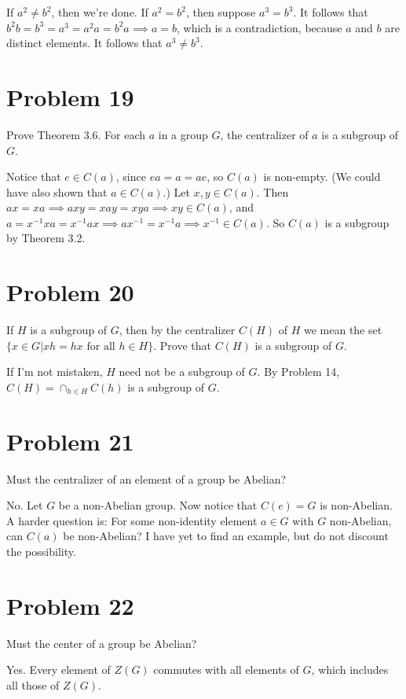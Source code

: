\documentclass[12pt]{article}
\begin{document}
If $a^2\neq b^2$, then we're done.  If $a^2=b^2$, then suppose $a^3=b^3$.
It follows that $b^2b = b^3=a^3=a^2a=b^2a\implies a=b$, which is a contradiction,
because $a$ and $b$ are distinct elements.  It follows that $a^3\neq b^3$.

\section*{Problem 19}

Prove Theorem 3.6.  For each $a$ in a group $G$, the centralizer
of $a$ is a subgroup of $G$.

Notice that $e\in C(a)$, since $ea=a=ae$, so $C(a)$ is non-empty.  (We could
have also shown that $a\in C(a)$.)
Let $x,y\in C(a)$.  Then $ax=xa\implies axy=xay=xya\implies xy\in C(a)$,
and $a=x^{-1}xa=x^{-1}ax\implies ax^{-1}=x^{-1}a\implies x^{-1}\in C(a)$.
So $C(a)$ is a subgroup by Theorem 3.2.

\section*{Problem 20}

If $H$ is a subgroup of $G$, then by the centralizer $C(H)$ of $H$ we mean the
set $\{x\in G|\mbox{$xh=hx$ for all $h\in H$}\}$.  Prove that $C(H)$ is a subgroup of $G$.

If I'm not mistaken, $H$ need not be a subgroup of $G$.  By Problem 14,
$C(H)=\cap_{h\in H}C(h)$ is a subgroup of $G$.

\section*{Problem 21}

Must the centralizer of an element of a group be Abelian?

No.  Let $G$ be a non-Abelian group.  Now notice that $C(e)=G$ is non-Abelian.
A harder question is: For some non-identity element $a\in G$ with $G$ non-Abelian,
can $C(a)$ be non-Abelian?  I have yet to find an example, but do not discount
the possibility.

\section*{Problem 22}

Must the center of a group be Abelian?

Yes.  Every element of $Z(G)$ commutes with all elements of $G$, which includes
all those of $Z(G)$.
\end{document}

